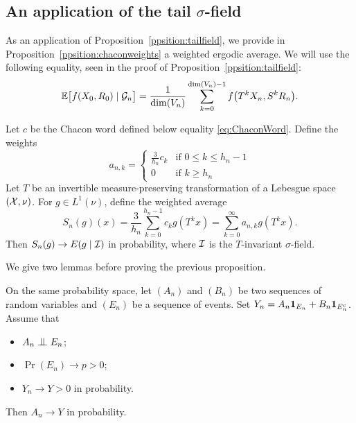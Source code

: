 \documentclass[12pt,a4paper]{article}
\begin{document}
\subsection{An application of the tail $\sigma$-field}

As an application of Proposition~\ref{ppsition:tailfield}, 
we provide in Proposition~\ref{ppsition:chaconweights} a 
weighted ergodic average.
We will use the following equality, seen in the proof of Proposition~\ref{ppsition:tailfield}: 
\begin{equation}\label{eq:conditionalexpectation}
\mathbb{E}\bigl[f(X_0, R_0) \mid \mathcal{G}_n\bigr]
 =\frac{1}{\dim(V_n)}\sum_{k=0}^{\dim(V_n)-1} f\bigl(T^kX_n, S^kR_n \bigr).
\end{equation}

\begin{ppsition}\label{ppsition:chaconweights}
Let $c$ be the Chacon word defined below equality \eqref{eq:ChaconWord}. 
Define the weights 
$$
a_{n,k} = \begin{cases}
\frac{3}{h_n} c_k & \text{if $0 \leq k \leq h_n-1$} \\
0 & \text{if $k \geq h_n$}
\end{cases}
$$
Let $T$ be an invertible measure-preserving transformation of a Lebesgue space 
$(\mathcal{X}, \nu)$. 
For $g \in L^1(\nu)$, define the weighted average
$$
S_n(g)(x) = \frac{3}{h_n}\sum_{k=0}^{h_n-1} c_k g(T^kx) 
= \sum_{k=0}^\infty a_{n,k} g(T^kx).  
$$ 
Then $S_n(g) \to E(g \mid {\cal I})$ in probability, 
where ${\cal I}$ is the $T$-invariant $\sigma$-field.
\end{ppsition}

We give two lemmas before proving the previous proposition.

\begin{lemma}\label{lemme:convergence}
On the same probability space, let $(A_n)$ and $(B_n)$ be two 
sequences of random variables and $(E_n)$ be a sequence of events. 
Set $Y_n = A_n \boldsymbol 1_{E_n} + B_n \boldsymbol 1_{E_n^c}$. 
Assume that 
\begin{itemize}
\item $A_n \indep E_n$;

\item $\Pr(E_n) \to p>0$;

\item $Y_n \to Y >0$ in probability.
\end{itemize}
Then $A_n \to Y$ in probability.
\end{lemma}
\end{document}
